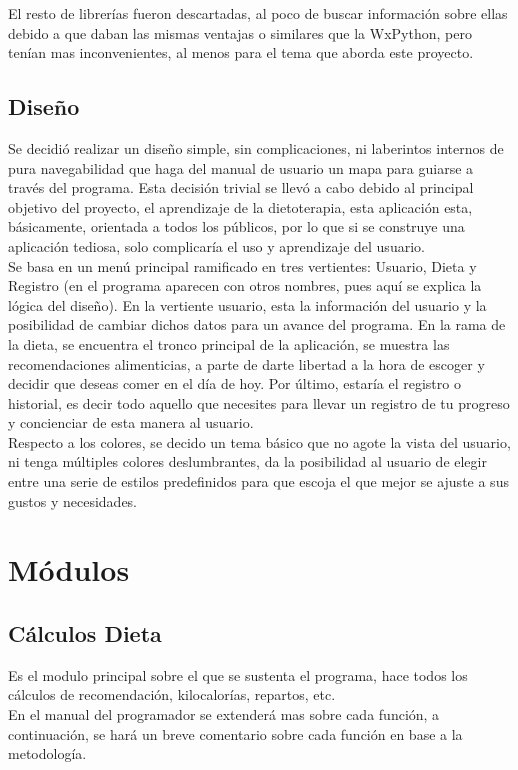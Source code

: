 El resto de librerías fueron descartadas, al poco de buscar información sobre ellas debido a que daban las mismas ventajas o similares que la WxPython, pero tenían mas inconvenientes, al menos para el tema que aborda este proyecto.
\subsection{Diseño}
Se decidió realizar un diseño simple, sin complicaciones, ni laberintos internos de pura navegabilidad que haga del manual de usuario un mapa para guiarse a través del programa. Esta decisión trivial se llevó a cabo debido al principal objetivo del proyecto, el aprendizaje de la dietoterapia, esta aplicación esta, básicamente, orientada a todos los públicos, por lo que si se construye una aplicación tediosa, solo complicaría el uso y aprendizaje del usuario.\\

Se basa en un menú principal ramificado en tres vertientes: Usuario, Dieta y Registro (en el programa aparecen con otros nombres, pues aquí se explica la lógica del diseño). En la vertiente usuario, esta la información del usuario y la posibilidad de cambiar dichos datos para un avance del programa. En la rama de la dieta, se encuentra el tronco principal de la aplicación, se muestra las recomendaciones alimenticias, a parte de darte libertad a la hora de escoger y decidir que deseas comer en el día de hoy. Por último, estaría el registro o historial, es decir todo aquello que necesites para llevar un registro de tu progreso y concienciar de esta manera al usuario.\\

Respecto a los colores, se decido un tema básico que no agote la vista del usuario, ni tenga múltiples colores deslumbrantes, da la posibilidad al usuario de elegir entre una serie de estilos predefinidos para que escoja el que mejor se ajuste a sus gustos y necesidades.\\
\section{Módulos}
\subsection{Cálculos Dieta}
Es el modulo principal sobre el que se sustenta el programa, hace todos los cálculos de recomendación, kilocalorías, repartos, etc.\\
En el manual del programador se extenderá mas sobre cada función, a continuación, se hará un breve comentario sobre cada función en base a la metodología.
